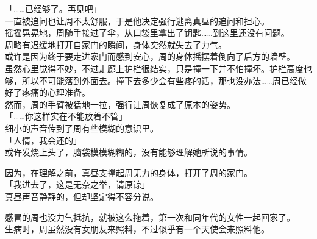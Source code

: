 「……已经够了。再见吧」\\

一直被追问也让周不太舒服，于是他决定强行逃离真昼的追问和担心。\\

摇摇晃晃地，周随手接过了伞，从口袋里拿出了钥匙……到这里还没有问题。\\

周略有迟缓地打开自家门的瞬间，身体突然就失去了力气。\\

或许是因为终于要走进家门而感到安心，周的身体摇摆着倒向了后方的墙壁。\\

虽然心里觉得不妙，不过走廊上护栏很结实，只是撞一下并不怕撞坏。护栏高度也够，所以不可能落到外面去。撞下去多少会有些疼的话，那也没办法……周已经做好了疼痛的心理准备。\\

然而，周的手臂被猛地一拉，强行让周恢复成了原本的姿势。\\

「……你这样实在不能放着不管」\\

细小的声音传到了周有些模糊的意识里。\\

「人情，我会还的」\\

或许发烧上头了，脑袋模模糊糊的，没有能够理解她所说的事情。

因为，在理解之前，真昼支撑起周无力的身体，打开了周的家门。\\

「我进去了，这是无奈之举，请原谅」\\

真昼声音静静的，但却坚定得不容分说。

感冒的周也没力气抵抗，就被这么拖着，第一次和同年代的女性一起回家了。\\

生病时，周虽然没有女朋友来照料，不过似乎有一个天使会来照料他。
